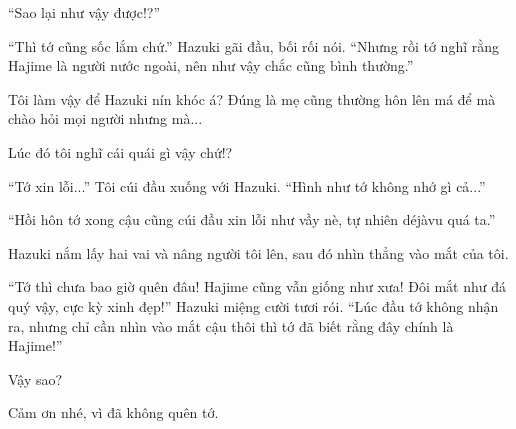 {``Sao lại như vậy được!?''

``Thì tớ cũng sốc lắm chứ.'' Hazuki gãi đầu, bối rối nói. ``Nhưng rồi tớ
nghĩ rằng Hajime là người nước ngoài, nên như vậy chắc cũng bình
thường.''

Tôi làm vậy để Hazuki nín khóc á? Đúng là mẹ cũng thường hôn lên má để
mà chào hỏi mọi người nhưng mà...

Lúc đó tôi nghĩ cái quái gì vậy chứ!?

``Tớ xin lỗi...'' Tôi cúi đầu xuống với Hazuki. ``Hình như tớ không nhớ
gì cả...''

``Hồi hôn tớ xong cậu cũng cúi đầu xin lỗi như vầy nè, tự nhiên déjàvu
quá ta.''

Hazuki nắm lấy hai vai và nâng người tôi lên, sau đó nhìn thẳng vào mắt
của tôi.

``Tớ thì chưa bao giờ quên đâu! Hajime cũng vẫn giống như xưa! Đôi mắt
như đá quý vậy, cực kỳ xinh đẹp!'' Hazuki miệng cười tươi rói. ``Lúc đầu
tớ không nhận ra, nhưng chỉ cần nhìn vào mắt cậu thôi thì tớ đã biết
rằng đây chính là Hajime!''

Vậy sao?

Cảm ơn nhé, vì đã không quên tớ.
}